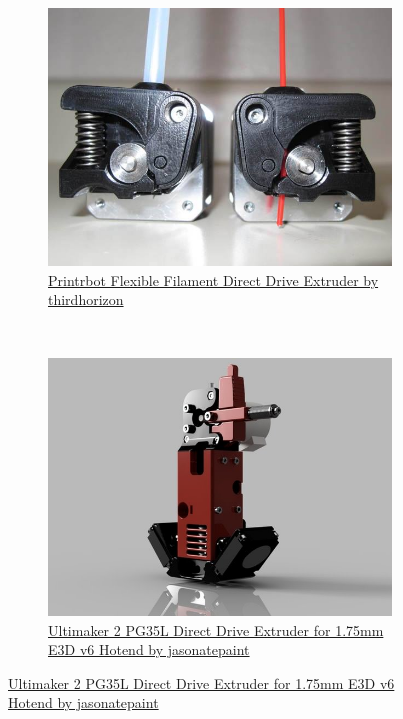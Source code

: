 \documentclass[11pt,a4paper]{article}
\begin{document}
\begin{figure}[H]
    \centering
    ~ %
    \begin{subfigure}[b]{0.4\textwidth}
        \includegraphics[width=\textwidth,cfbox=azul_marcos 4pt 0pt]{FOTOS/EXTRUSOR3}
		\caption*{\href{http://www.thingiverse.com/thing:403438}{{\footnotesize Printrbot Flexible Filament Direct Drive Extruder by thirdhorizon}}}
    \end{subfigure}
    ~ \qquad %
    \begin{subfigure}[b]{0.4\textwidth}
        \includegraphics[width=\textwidth,cfbox=azul_marcos 4pt 0pt]{FOTOS/EXTRUSOR4}
		\caption*{\href{http://www.thingiverse.com/thing:1102900}{{\footnotesize Ultimaker 2 PG35L Direct Drive Extruder for 1.75mm E3D v6 Hotend by jasonatepaint}}}
    \end{subfigure}
\end{figure}
\end{document}
